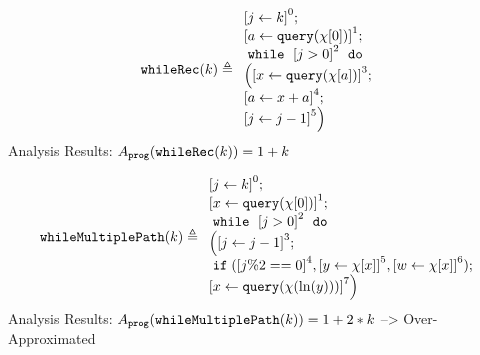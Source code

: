     
                \begin{example}
                    \label{ex:ifValueDependency}
                    \[
                    \kw{whileRec}(k) \triangleq
                    \begin{array}{l}
                        \clabel{ \assign{j}{k} }^{0} ; \\
                        \clabel{ \assign{a}{\query(\chi[0])} }^{1} ; \\
                            \ewhile ~ \clabel{j > 0}^{2} ~ \edo ~ \\
                            \Big(
                             \clabel{\assign{x}{\query(\chi[a]) }}^{3}  ; \\
                             \clabel{\assign{a}{x + a}}^{4} ;\\
                            \clabel{\assign{j}{j-1}}^{5}       \Big)
                        \end{array}
                    \]
                    Analysis Results: $ A_{\mathtt{prog}}(\mathtt{whileRec}(k)) = 1 + k$
                \end{example}
            \begin{example}
                \label{ex:whileMultiplePath}
            \[
            \kw{whileMultiplePath}(k) \triangleq 
            \begin{array}{l}
                \clabel{ \assign{j}{k}}^{0} ; \\
                \clabel{ \assign{x}{\query(\chi[0])} }^{1} ; \\
                    \ewhile ~ \clabel{j > 0}^{2} ~ \edo ~ \\
                    \Big(
                     \clabel{\assign{j}{j-1}}^{3} ;\\
                     \eif(\clabel{j \% 2 == 0}^{4}, 
                     \clabel{\assign{y}{\chi[x]}}^{5}, 
                     \clabel{\assign{w}{\chi[x]}}^{6});\\                            
                     \clabel{\assign{x}{\query(\chi(\ln(y)))} }^{7} \Big)
                \end{array}
            \]
            Analysis Results: $ A_{\mathtt{prog}}(\mathtt{whileMultiplePath}(k)) = 1 + 2 * k $ --> Over-Approximated
        \end{example}
